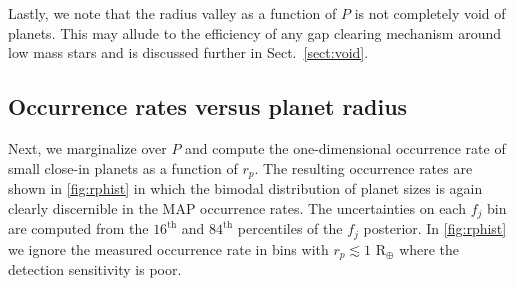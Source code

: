 \documentclass[twocolumn]{emulateapj}
\begin{document}
Lastly, we note that the radius valley as a function of $P$ is not completely void of planets.
This may allude to the efficiency of any gap clearing mechanism around low mass stars and is
discussed further in Sect.~\ref{sect:void}.

\vspace{1cm}

\subsection{Occurrence rates versus planet radius}
Next, we marginalize over $P$ and compute the one-dimensional occurrence rate of small close-in planets
as a function of $r_p$. The resulting occurrence rates are shown in \autoref{fig:rphist} in which the bimodal
distribution of planet sizes is again clearly discernible in the MAP occurrence rates.
The uncertainties on each $f_j$ bin are computed from the $16^{\text{th}}$ and $84^{\text{th}}$ percentiles
of the $f_j$ posterior. In \autoref{fig:rphist} we ignore the measured occurrence rate in bins with
$r_p\lesssim 1$ R$_{\oplus}$ where the detection sensitivity is poor.
\end{document}
